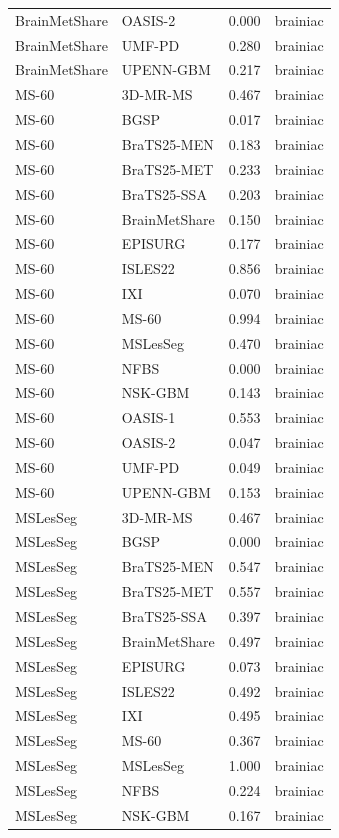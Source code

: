\begin{tabular}{llrl}
BrainMetShare & OASIS-2 & 0.000 & brainiac \\
BrainMetShare & UMF-PD & 0.280 & brainiac \\
BrainMetShare & UPENN-GBM & 0.217 & brainiac \\
MS-60 & 3D-MR-MS & 0.467 & brainiac \\
MS-60 & BGSP & 0.017 & brainiac \\
MS-60 & BraTS25-MEN & 0.183 & brainiac \\
MS-60 & BraTS25-MET & 0.233 & brainiac \\
MS-60 & BraTS25-SSA & 0.203 & brainiac \\
MS-60 & BrainMetShare & 0.150 & brainiac \\
MS-60 & EPISURG & 0.177 & brainiac \\
MS-60 & ISLES22 & 0.856 & brainiac \\
MS-60 & IXI & 0.070 & brainiac \\
MS-60 & MS-60 & 0.994 & brainiac \\
MS-60 & MSLesSeg & 0.470 & brainiac \\
MS-60 & NFBS & 0.000 & brainiac \\
MS-60 & NSK-GBM & 0.143 & brainiac \\
MS-60 & OASIS-1 & 0.553 & brainiac \\
MS-60 & OASIS-2 & 0.047 & brainiac \\
MS-60 & UMF-PD & 0.049 & brainiac \\
MS-60 & UPENN-GBM & 0.153 & brainiac \\
MSLesSeg & 3D-MR-MS & 0.467 & brainiac \\
MSLesSeg & BGSP & 0.000 & brainiac \\
MSLesSeg & BraTS25-MEN & 0.547 & brainiac \\
MSLesSeg & BraTS25-MET & 0.557 & brainiac \\
MSLesSeg & BraTS25-SSA & 0.397 & brainiac \\
MSLesSeg & BrainMetShare & 0.497 & brainiac \\
MSLesSeg & EPISURG & 0.073 & brainiac \\
MSLesSeg & ISLES22 & 0.492 & brainiac \\
MSLesSeg & IXI & 0.495 & brainiac \\
MSLesSeg & MS-60 & 0.367 & brainiac \\
MSLesSeg & MSLesSeg & 1.000 & brainiac \\
MSLesSeg & NFBS & 0.224 & brainiac \\
MSLesSeg & NSK-GBM & 0.167 & brainiac \\

\end{tabular}
